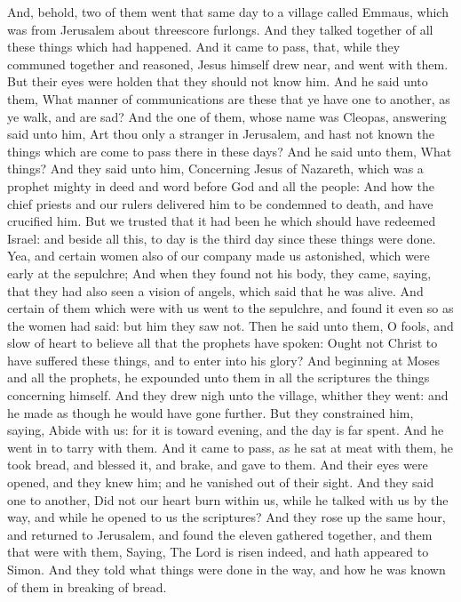  And, behold, two of them went that same day to a village
called Emmaus, which was from Jerusalem about threescore furlongs.
 And they talked together of all these things which had
happened.  And it came to pass, that, while they communed
together and reasoned, Jesus himself drew near, and went with them.
 But their eyes were holden that they should not know
him.  And he said unto them, What manner of
communications are these that ye have one to another, as ye walk, and
are sad?  And the one of them, whose name was Cleopas,
answering said unto him, Art thou only a stranger in Jerusalem, and hast
not known the things which are come to pass there in these days?
 And he said unto them, What things? And they said unto
him, Concerning Jesus of Nazareth, which was a prophet mighty in deed
and word before God and all the people:  And how the
chief priests and our rulers delivered him to be condemned to death, and
have crucified him.  But we trusted that it had been he
which should have redeemed Israel: and beside all this, to day is the
third day since these things were done.  Yea, and certain
women also of our company made us astonished, which were early at the
sepulchre;  And when they found not his body, they came,
saying, that they had also seen a vision of angels, which said that he
was alive.  And certain of them which were with us went
to the sepulchre, and found it even so as the women had said: but him
they saw not.  Then he said unto them, O fools, and slow
of heart to believe all that the prophets have spoken: 
Ought not Christ to have suffered these things, and to enter into his
glory?  And beginning at Moses and all the prophets, he
expounded unto them in all the scriptures the things concerning himself.
 And they drew nigh unto the village, whither they went:
and he made as though he would have gone further.  But
they constrained him, saying, Abide with us: for it is toward evening,
and the day is far spent. And he went in to tarry with them.
 And it came to pass, as he sat at meat with them, he
took bread, and blessed it, and brake, and gave to them. 
And their eyes were opened, and they knew him; and he vanished out of
their sight.  And they said one to another, Did not our
heart burn within us, while he talked with us by the way, and while he
opened to us the scriptures?  And they rose up the same
hour, and returned to Jerusalem, and found the eleven gathered together,
and them that were with them,  Saying, The Lord is risen
indeed, and hath appeared to Simon.  And they told what
things were done in the way, and how he was known of them in breaking of
bread.

